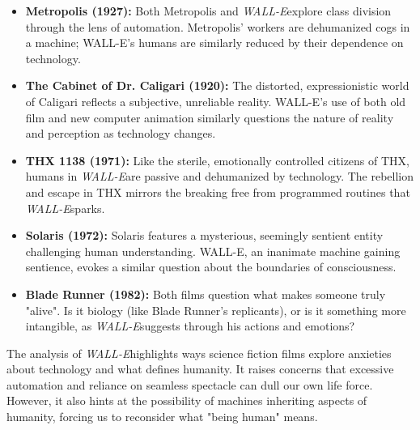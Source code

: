 \documentclass[11pt,fleqn]{book}
\begin{document}
\begin{itemize}
\item \textbf{Metropolis (1927):} Both Metropolis and \textit{WALL-E}explore class division through the lens of automation. Metropolis' workers are dehumanized cogs in a machine; WALL-E's humans are similarly reduced by their dependence on technology.

\item \textbf{The Cabinet of Dr. Caligari (1920):} The distorted, expressionistic world of Caligari reflects a subjective, unreliable reality. WALL-E's use of both old film and new computer animation similarly questions the nature of reality and perception as technology changes.

\item \textbf{THX 1138 (1971):}  Like the sterile, emotionally controlled citizens of THX, humans in \textit{WALL-E}are passive and dehumanized by technology. The rebellion and escape in THX mirrors the breaking free from programmed routines that \textit{WALL-E}sparks.

\item \textbf{Solaris (1972):} Solaris features a mysterious, seemingly sentient entity challenging human understanding. WALL-E, an inanimate machine gaining sentience, evokes a similar question about the boundaries of consciousness.

\item \textbf{Blade Runner (1982):} Both films question what makes someone truly "alive". Is it biology (like Blade Runner's replicants), or is it something more intangible, as \textit{WALL-E}suggests through his actions and emotions?
\end{itemize}

\vspace{5pt}

The analysis of \textit{WALL-E}highlights ways science fiction films explore anxieties about technology and what defines humanity. It raises concerns that excessive automation and reliance on seamless spectacle can dull our own life force. However, it also hints at the possibility of machines inheriting aspects of humanity, forcing us to reconsider what "being human" means. 
\end{document}
